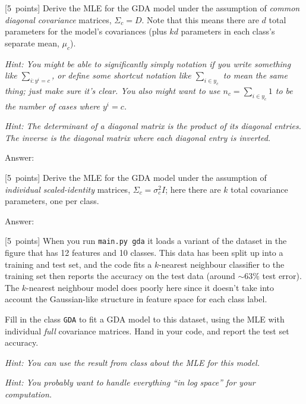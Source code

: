 \documentclass{article}
\newcommand{\ask}[1]{\textcolor{question}{#1}}
\newenvironment{answer}{\par\begingroup\color{answer}Answer: }{\endgroup}
\newcommand{\pts}[1]{\textcolor{points}{[#1~points]}}
\newcommand{\hint}[1]{\textcolor{black!60!white}{\emph{Hint: #1}}}
\newcommand{\TODO}{\color{red}{TODO}}
\begin{document}
\begin{qlist}
\item \pts{5}
    \ask{Derive the MLE for the GDA model under the assumption of \emph{common diagonal covariance} matrices},
    $\Sigma_c = D$.
    Note that this means there are $d$ total parameters for the model's covariances
    (plus $k d$ parameters in each class's separate mean, $\mu_c$).

\hint{%
    You might be able to significantly simply notation if you write something like $\sum_{i : y^i = c}$,
    or define some shortcut notation like $\sum_{i \in y_c}$ to mean the same thing;
    just make sure it's clear.
    You also might want to use $n_c = \sum_{i \in y_c} 1$ to be the number of cases where $y^i = c$.
}

\hint{%
    The determinant of a diagonal matrix is the product of its diagonal entries.
    The inverse is the diagonal matrix where each diagonal entry is inverted.
}

\begin{answer}\TODO\end{answer}

\item \pts{5}
    \ask{Derive the MLE for the GDA model under the assumption of \emph{individual scaled-identity} matrices},
    $\Sigma_c = \sigma_c^2 I$;
    here there are $k$ total covariance parameters, one per class.

\begin{answer}\TODO\end{answer}

\item \pts{5}
    When you run \texttt{main.py gda} it loads a variant of the dataset in the figure that has 12 features and 10 classes.
    This data has been split up into a training and test set, and the code fits a $k$-nearest neighbour classifier to the training set then reports the accuracy on the test data (around $\sim 63\%$ test error).
    The $k$-nearest neighbour model does poorly here since it doesn't take into account the Gaussian-like structure in feature space for each class label.

    Fill in the class \texttt{GDA} to fit a GDA model to this dataset, using the MLE with individual \emph{full} covariance matrices. 
    \ask{Hand in your code, and report the test set accuracy}.

    \hint{You can use the result from class about the MLE for this model.}

    \hint{You probably want to handle everything ``in log space'' for your computation.}


\end{qlist}
\end{document}
